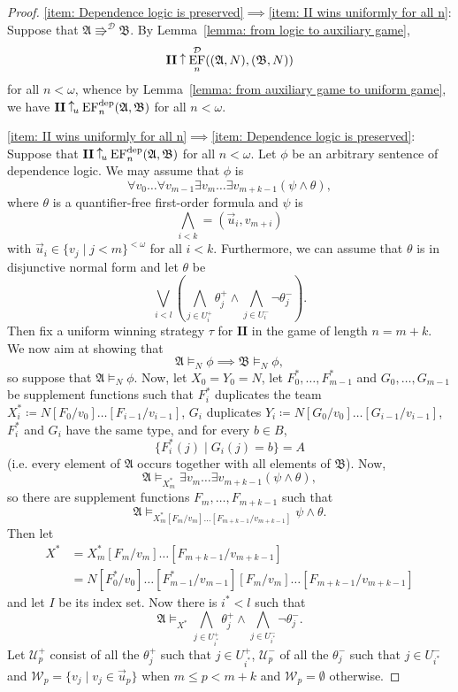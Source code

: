 \documentclass[10pt,a4paper]{amsart}
\newcommand{\wins}{\mathbin{\raisebox{0.8\depth}{$\uparrow$}}}
\newcommand{\playertwo}{\mathrm{\mathbf{II}}}
\DeclareMathOperator{\EF}{EF}
\newcommand{\EFdep}{\EF^{\mathrm{dep}}}
\newcommand{\winsu}{\wins_{\!\textrm u}}
\newcommand{\W}{\mathcal W}
\newcommand{\U}{\mathcal U}
\newcommand{\A}{\mathfrak{A}}
\newcommand{\B}{\mathfrak{B}}
\newcommand{\dep}{\mathop{=}}
\newcommand{\posEquiv}{\mathbin{\Rrightarrow}}
\newcommand{\deplog}{\mathcal D}
\begin{document}
\begin{proof}
    \ref{item: Dependence logic is preserved}$\implies$\ref{item: II wins uniformly for all n}: Suppose that $\A\posEquiv^\deplog\B$. By Lemma~\ref{lemma: from logic to auxiliary game},
    \[
        \playertwo\wins\EF^\deplog_n((\A,N),(\B,N))
    \]
    for all $n<\omega$, whence by Lemma~\ref{lemma: from auxiliary game to uniform game}, we have $\playertwo\winsu\EFdep_n(\A,\B)$ for all $n<\omega$.

    \ref{item: II wins uniformly for all n}$\implies$\ref{item: Dependence logic is preserved}: Suppose that $\playertwo\winsu\EFdep_n(\A,\B)$ for all $n<\omega$. Let $\phi$ be an arbitrary sentence of dependence logic. We may assume that $\phi$ is
    \[
         \forall v_0\dots\forall v_{m-1}\exists v_m\dots\exists v_{m+k-1}(\psi\land\theta),
    \]
    where $\theta$ is a  quantifier-free first-order formula and $\psi$ is
    \[
        \bigwedge_{i<k}\dep(\vec u_i, v_{m+i})
    \]
    with $\vec u_i \in\{v_j \mid j<m\}^{<\omega}$ for all $i<k$. Furthermore, we can assume that $\theta$ is in disjunctive normal form and let $\theta$ be
    \[
        \bigvee_{i<l}\left( \bigwedge_{j\in U^+_i}\theta^+_j \land \bigwedge_{j\in U^-_i}\neg\theta^-_j \right).
    \]
    Then fix a uniform winning strategy $\tau$ for $\playertwo$ in the game of length $n = m+k$. We now aim at showing that
    \[
        \A\models_N\phi \implies \B\models_N\phi,
    \]
    so suppose that $\A\models_N\phi$. Now, let $X_0 = Y_0 = N$, let $F^*_0,\dots,F^*_{m-1}$ and $G_0,\dots,G_{m-1}$ be supplement functions such that $F^*_i$ duplicates the team $X^*_i\coloneqq N[F_0/v_0]\dots[F_{i-1}/v_{i-1}]$, $G_i$ duplicates $Y_i\coloneqq N[G_0/v_0]\dots[G_{i-1}/v_{i-1}]$, $F^*_i$ and $G_i$ have the same type, and for every $b\in B$,
    \[
        \{F^*_i(j) \mid G_i(j) = b \} = A
    \]
    (i.e. every element of $\A$ occurs together with all elements of $\B$). Now,
    \[
        \A\models_{X^*_m}\exists v_m\dots\exists v_{m+k-1}(\psi\land\theta),
    \]
    so there are supplement functions $F_m,\dots,F_{m+k-1}$ such that
    \[
        \A\models_{X^*_m[F_m/v_m]\dots[F_{m+k-1}/v_{m+k-1}]}\psi\land\theta.
    \]
    Then let
    \begin{align*}
        X^* &= X^*_m[F_m/v_m]\dots[F_{m+k-1}/v_{m+k-1}] \\
        &= N[F^*_0/v_0]\dots[F^*_{m-1}/v_{m-1}][F_m/v_m]\dots[F_{m+k-1}/v_{m+k-1}]
    \end{align*}
    and let $I$ be its index set.
    Now there is $i^*<l$ such that
    \[
        \A\models_{X^*} \bigwedge_{j\in U^+_{i^*}}\theta^+_j \land \bigwedge_{j\in U^-_{i^*}}\neg\theta^-_j.
    \]
    Let $\U^+_p$ consist of all the $\theta_j^+$ such that $j\in U^+_{i^*}$, $\U^-_p$ of all the $\theta_j^-$ such that $j\in U^-_{i^*}$ and $\W_p = \{v_j \mid v_j\in\vec u_p\}$ when $m\leq p < m+k$ and $\W_p = \emptyset$ otherwise.


\end{proof}
\end{document}
